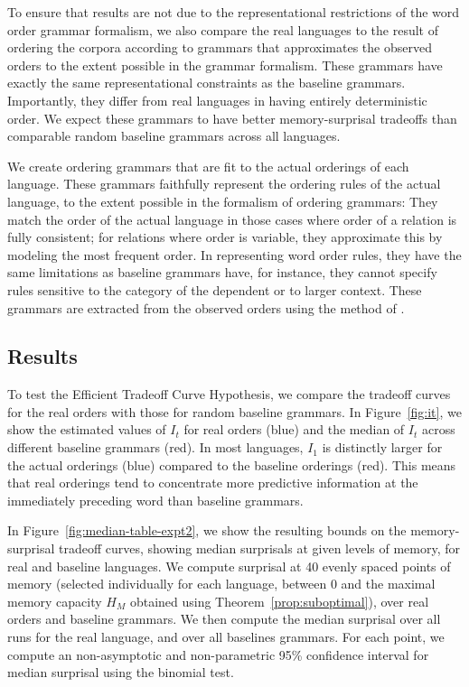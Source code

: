 To ensure that results are not due to the representational restrictions of the word order grammar formalism, we also compare the real languages to the result of ordering the corpora according to grammars that approximates the observed orders to the extent possible in the grammar formalism.
These grammars have exactly the same representational constraints as the baseline grammars.
Importantly, they differ from real languages in having entirely deterministic order.
We expect these grammars to have better memory-surprisal tradeoffs than comparable random baseline grammars across all languages.

We create ordering grammars that are fit to the actual orderings of each language.
These grammars faithfully represent the ordering rules of the actual language, to the extent  possible in the formalism of ordering grammars:
They match the order of the actual language in those cases where order of a relation is fully consistent; for relations where order is variable, they approximate this by modeling the most frequent order.
In representing word order rules, they have the same limitations as baseline grammars have, for instance, they cannot specify rules sensitive to the category of the dependent or to larger context.
These grammars are extracted from the observed orders using the method of \cite{hahn2020universals}.


\subsection{Results}\label{sec:main-experiment-results}
To test the Efficient Tradeoff Curve Hypothesis, we compare the tradeoff curves for the real orders with those for random baseline grammars.
In Figure~\ref{fig:it}, we show the estimated values of $I_t$ for real orders (blue) and the median of $I_t$ across different baseline grammars (red).
In most languages, $I_1$ is distinctly larger for the actual orderings (blue) compared to the baseline orderings (red). This means that real orderings tend to concentrate more predictive information at the immediately preceding word than baseline grammars.

In Figure~\ref{fig:median-table-expt2}, we show the resulting bounds on the memory-surprisal tradeoff curves, showing median surprisals at given levels of memory, for real and baseline languages.
We compute surprisal at 40 evenly spaced points of memory (selected individually for each language, between 0 and the maximal memory capacity $H_M$ obtained using Theorem~\ref{prop:suboptimal}), over real orders and baseline grammars.
We then compute the median surprisal over all runs for the real language, and over all baselines grammars.
For each point, we compute an non-asymptotic and non-parametric 95\% confidence interval for median surprisal using the binomial test.

